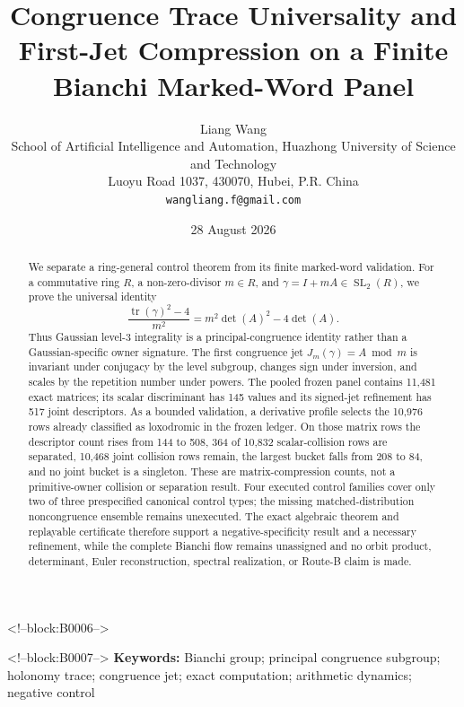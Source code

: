 \documentclass[11pt,a4paper]{article}
\title{Congruence Trace Universality and First-Jet Compression on a Finite Bianchi Marked-Word Panel}
\author{Liang Wang\\
\small School of Artificial Intelligence and Automation, Huazhong University of Science and Technology\\
\small Luoyu Road 1037, 430070, Hubei, P.R. China\\
\small \texttt{wangliang.f@gmail.com}}
\date{28 August 2026}
\theoremstyle{definition}
\theoremstyle{remark}
\newcommand{\SL}{\operatorname{SL}}
\newcommand{\tr}{\operatorname{tr}}
\begin{document}
\maketitle

<!--block:B0006-->
\begin{abstract}
We separate a ring-general control theorem from its finite marked-word validation. For a commutative ring \(R\), a non-zero-divisor \(m\in R\), and \(\gamma=I+mA\in\SL_2(R)\), we prove the universal identity
\[
  \frac{\tr(\gamma)^2-4}{m^2}=m^2\det(A)^2-4\det(A).
\]
Thus Gaussian level-\(3\) integrality is a principal-congruence identity rather than a Gaussian-specific owner signature. The first congruence jet \(J_m(\gamma)=A\bmod m\) is invariant under conjugacy by the level subgroup, changes sign under inversion, and scales by the repetition number under powers. The pooled frozen panel contains 11,481 exact matrices; its scalar discriminant has 145 values and its signed-jet refinement has 517 joint descriptors. As a bounded validation, a derivative profile selects the 10,976 rows already classified as loxodromic in the frozen ledger. On those matrix rows the descriptor count rises from 144 to 508, 364 of 10,832 scalar-collision rows are separated, 10,468 joint collision rows remain, the largest bucket falls from 208 to 84, and no joint bucket is a singleton. These are matrix-compression counts, not a primitive-owner collision or separation result. Four executed control families cover only two of three prespecified canonical control types; the missing matched-distribution noncongruence ensemble remains unexecuted. The exact algebraic theorem and replayable certificate therefore support a negative-specificity result and a necessary refinement, while the complete Bianchi flow remains unassigned and no orbit product, determinant, Euler reconstruction, spectral realization, or Route-B claim is made.
\end{abstract}

<!--block:B0007-->
\noindent\textbf{Keywords:} Bianchi group; principal congruence subgroup; holonomy trace; congruence jet; exact computation; arithmetic dynamics; negative control
\end{document}
